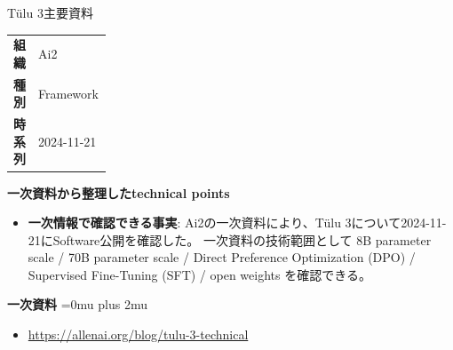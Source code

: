 \begin{technicalnote}{Tülu 3}{主要資料}
\begingroup
\begin{tabularx}{\linewidth}{@{}>{\bfseries}p{0.22\linewidth}X@{}}
組織 & Ai2 \\
種別 & Framework \\
時系列 & 2024-11-21 \\
\end{tabularx}
\smallskip
{\bfseries 一次資料から整理したtechnical points}
\begin{itemize}[leftmargin=1.5em,itemsep=0.35em]
\item \textbf{一次情報で確認できる事実}: Ai2の一次資料により、Tülu 3について2024-11-21にSoftware公開を確認した。 一次資料の技術範囲として 8B parameter scale / 70B parameter scale / Direct Preference Optimization (DPO) / Supervised Fine-Tuning (SFT) / open weights を確認できる。
\end{itemize}
\begin{minipage}{\linewidth}
\begin{samepage}
{\bfseries 一次資料}
\begingroup\sloppy
\Urlmuskip=0mu plus 2mu\relax
\begin{itemize}[leftmargin=1.5em,itemsep=0.25em]
\item {\scriptsize\url{https://allenai.org/blog/tulu-3-technical}}
\end{itemize}
\endgroup
\end{samepage}
\end{minipage}
\endgroup
\end{technicalnote}
\medskip

